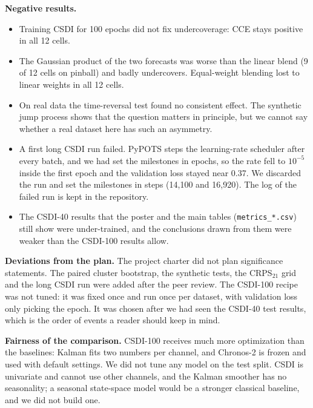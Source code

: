 \documentclass[10pt,twocolumn]{article}
\newcommand{\Chr}{Chronos-2}
\begin{document}
\textbf{Negative results.}
\begin{itemize}
\item Training CSDI for 100 epochs did not fix undercoverage: CCE stays positive in all 12 cells.
\item The Gaussian product of the two forecasts was worse than the linear blend (9 of 12 cells on pinball) and badly undercovers. Equal-weight blending lost to linear weights in all 12 cells.
\item On real data the time-reversal test found no consistent effect. The synthetic jump process shows that the question matters in principle, but we cannot say whether a real dataset here has such an asymmetry.
\item A first long CSDI run failed. PyPOTS steps the learning-rate scheduler after every batch, and we had set the milestones in epochs, so the rate fell to $10^{-5}$ inside the first epoch and the validation loss stayed near 0.37. We discarded the run and set the milestones in steps (14,100 and 16,920). The log of the failed run is kept in the repository.
\item The CSDI-40 results that the poster and the main tables (\texttt{metrics\_*.csv}) still show were under-trained, and the conclusions drawn from them were weaker than the CSDI-100 results allow.
\end{itemize}

\textbf{Deviations from the plan.} The project charter did not plan significance statements. The paired cluster bootstrap, the synthetic tests, the CRPS$_{21}$ grid and the long CSDI run were added after the peer review. The CSDI-100 recipe was not tuned: it was fixed once and run once per dataset, with validation loss only picking the epoch. It was chosen after we had seen the CSDI-40 test results, which is the order of events a reader should keep in mind.

\textbf{Fairness of the comparison.} CSDI-100 receives much more optimization than the baselines: Kalman fits two numbers per channel, and \Chr{} is frozen and used with default settings. We did not tune any model on the test split. CSDI is univariate and cannot use other channels, and the Kalman smoother has no seasonality; a seasonal state-space model would be a stronger classical baseline, and we did not build one.
\end{document}
